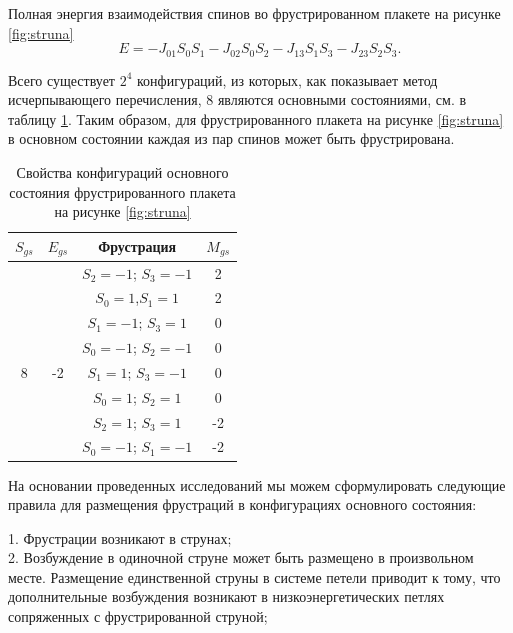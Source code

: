 \documentclass[utf8, babel, sor, jor, amsmath, amssymb, reprint]{elsarticle} %
\begin{document}
Полная энергия взаимодействия спинов во фрустрированном плакете на рисунке \ref{fig:struna}
\begin{equation}
	E = -J_{01} S_0 S_1-J_{02} S_0 S_2-J_{13} S_1 S_3-J_{23} S_2 S_3.
	\label{eq:ising_energy_2x2}
\end{equation}

Всего существует $2^4$ конфигураций, из которых, как показывает метод исчерпывающего перечисления, 8 являются основными состояниями, см. в таблицу \ref{tab:Strunags}. Таким образом, для фрустрированного плакета на рисунке \ref{fig:struna} в основном состоянии каждая из пар спинов может быть фрустрирована.

\begin{table}[h]
		\centering
	\begin{tabular}{|c|c|c|c|}
	
		\hline
	 $S_{gs}$	& $E_{gs}$    & Фрустрация  &   $M_{gs}$   \\
	\hline
	    & & 	$S_2=-1$; $S_3=-1$ & 2   \\ 	\cline{3-4}
	   	& & $S_0=1$,$S_1=1$        & 2\\ 	\cline{3-4}
		& &  $S_1=-1$; $S_3=1$     & 0    \\ \cline{3-4} 
        &  & $S_0=-1$; $S_2=-1$ &	0  \\ 
		\cline{3-4} 
		8	\multirow{3}{*}{} & -2 \multirow{3}{*}{} & $S_1=1$;  $S_3=-1$     &  0\\ \cline{3-4}	
		& & $S_0=1$;  $S_2=1$      &  0\\ \cline{3-4}
		& &	$S_2=1$;  $S_3=1$      &  -2\\ \cline{3-4}
		& &	$S_0=-1$; $S_1=-1$     & -2\\ \hline
	
	\end{tabular}
	\caption{Свойства конфигураций основного состояния фрустрированного плакета на рисунке \ref{fig:struna}}
	\label{tab:Strunags}
\end{table}





На основании проведенных исследований мы можем сформулировать следующие правила для размещения фрустраций в конфигурациях основного состояния:
 
1. Фрустрации возникают в струнах;\\

2. Возбуждение в одиночной струне может быть размещено в произвольном месте. Размещение единственной струны в системе петели  приводит к тому, что дополнительные возбуждения возникают в низкоэнергетических петлях сопряженных с фрустрированной струной;\\  
\end{document}

